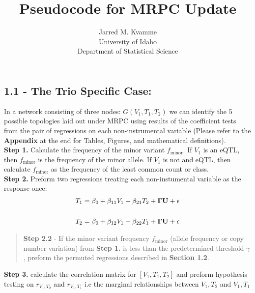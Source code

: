 \documentclass[12pt]{report}
\begin{document}
\begin{titlepage}
\title{Pseudocode for MRPC Update}
\author{ Jarred M. Kvamme \\ University of Idaho \\ Department of Statistical Science }
\maketitle
\end{titlepage}

\newcommand{\indep}{\perp \!\!\! \perp}



\subsection*{1.1 - The Trio Specific Case:}

In a network consisting of three nodes: $G(V_1, T_1, T_2)$ we can identify the 5 possible topologies laid out under MRPC using results of the coefficient tests from the pair of regressions on each non-instrumental variable (Please refer to the \textbf{Appendix} at the end for Tables, Figures, and mathematical definitions).\\

\noindent \textbf{Step 1.} Calculate the frequency of the minor variant $f_{\text{minor}}$. If $V_1$ is an eQTL, then $f_{\text{minor}}$ is the frequency of the minor allele. If $V_1$ is not and eQTL, then calculate $f_{\text{minor}}$ as the frequency of the least common count or class. \\

\noindent \textbf{Step 2.} Preform two regressions treating each non-instumental variable as the response once:  
\begin{eqnarray}
T_1 = \beta_0 +\beta_{11}V_1+\beta_{21}T_2+{\bf \Gamma U}+ \epsilon \\
\nonumber\\
T_2 = \beta_0 +\beta_{12}V_1+\beta_{22}T_1+{\bf \Gamma U}+ \epsilon 
\end{eqnarray}

\begin{quote}
\textbf{Step 2.2} - If the minor variant frequency $f_{\text{minor}}$ (allele frequency or copy number variation) from \textbf{Step 1.} is less than the predetermined threshold $\gamma$, preform the permuted regressions described in \textbf{Section 1.2}. 
\end{quote}
\noindent \textbf{Step 3.} calculate the correlation matrix for $[V_1, T_1, T_2]$ and preform hypothesis testing on $r_{V_1,T_2}$ and $r_{V_1, T_1}$ i.e the marginal relationships between $V_1,T_2$ and $V_1, T_1$ \\
\end{document}
